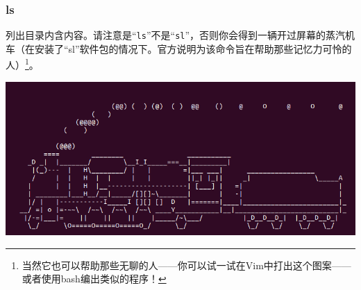 \subsubsection{ls}
\cite{manls}\par
列出目录内含内容。请注意是“\verb|ls|”不是“\verb|sl|”，否则你会得到一辆开过屏幕的蒸汽机车（在安装了“sl”软件包的情况下。官方说明为该命令旨在帮助那些记忆力可怜的人）\footnote{当然它也可以帮助那些无聊的人——你可以试一试在Vim中打出这个图案——或者使用bash编出类似的程序！}。
\begin{center}
	\includegraphics[scale=2.2]{pic/sl}
\end{center} \par
